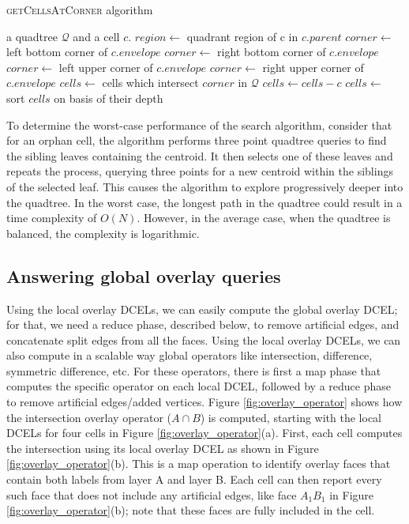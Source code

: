 {\ssp
\begin{algorithm} \caption{\textsc{getCellsAtCorner} algorithm}\label{alg:two}
    \begin{algorithmic}
    \Require a quadtree $\mathcal Q$ and a cell $c$.
        \State $region \gets $ quadrant region of c in $c.parent$
                \State $corner \gets$ left bottom corner of $c.envelope$
            \EndCase
                \State $corner \gets$ right bottom corner of $c.envelope$
            \EndCase
                \State $corner \gets$ left upper corner of $c.envelope$
            \EndCase
                \State $corner \gets$ right upper corner of $c.envelope$
            \EndCase
        \EndSwitch
        \State $cells \gets$ cells which intersect $corner$ in $\mathcal Q$
        \State $cells \gets cells - c$ 
        \State $cells \gets$ sort $cells$ on basis of their depth 
        \State {}
    \EndFunction
    \end{algorithmic}
\end{algorithm}
}

To determine the worst-case performance of the search algorithm, consider that for an orphan cell, the algorithm performs three point quadtree queries to find the sibling leaves containing the centroid. It then selects one of these leaves and repeats the process, querying three points for a new centroid within the siblings of the selected leaf. This causes the algorithm to explore progressively deeper into the quadtree. In the worst case, the longest path in the quadtree could result in a time complexity of $O(N)$. However, in the average case, when the quadtree is balanced, the complexity is logarithmic.

\subsection{Answering global overlay queries} %
Using the local overlay DCELs, we can easily compute the global overlay DCEL; for that, we need a reduce phase, described below, to remove artificial edges, and 
concatenate split edges from all the faces. Using the local overlay DCELs, we can also compute in a scalable way global operators like intersection, difference, 
symmetric difference, etc. For these operators, there is first a map phase that computes the specific operator on each local DCEL, followed by a reduce phase to 
remove artificial edges/added vertices.
Figure \ref{fig:overlay_operator} shows how the intersection overlay operator ($A \cap B$) is computed, starting with the local DCELs for four cells in Figure 
\ref{fig:overlay_operator}(a). First, each cell computes the intersection using its local overlay DCEL as shown in Figure \ref{fig:overlay_operator}(b). This is 
a map operation to identify overlay faces that contain both labels from layer A and layer B. Each cell can then report every such face that does not include any 
artificial edges, like face $A_1B_1$ in Figure \ref{fig:overlay_operator}(b); note that these faces are fully included in the cell. 

